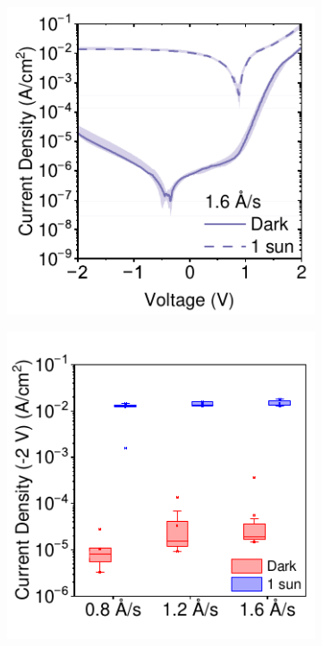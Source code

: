 \begin{figure}[htbp]
    \vspace{1em} %

    \begin{subfigure}[t]{0.45\textwidth}
        \centering
        \includegraphics[width=\textwidth]{chapters/material_properties/images/16AS-JV.pdf} %
        \caption{}
        \label{fig:ch2:1.6A/s-jv}
    \end{subfigure}
    \hfill
    \begin{subfigure}[t]{0.45\textwidth}
        \centering
        \includegraphics[width=\textwidth]{chapters/material_properties/images/Evap_Rate_Box_Plot.pdf} %

\end{subfigure}
\end{figure}
